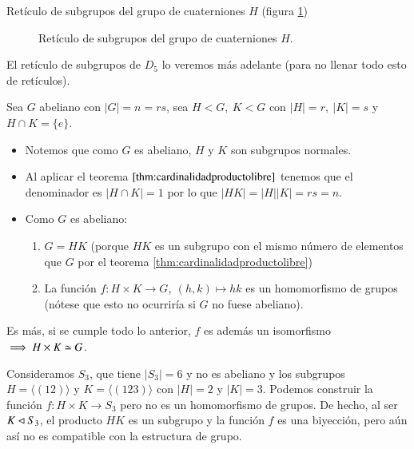 \begin{ej}
	Retículo de subgrupos del grupo de cuaterniones $H$ (figura \ref{fig:reticulocuaterniones})
	
	\begin{figure}[h]
		\centering
		\caption{Retículo de subgrupos del grupo de cuaterniones $H$.}
		\label{fig:reticulocuaterniones}
	\end{figure}
\end{ej}

El retículo de subgrupos de $D_5$ lo veremos más adelante (para no llenar todo esto de retículos).

\begin{ej}
	
	Sea $G$ abeliano con $|G| = n = rs$, sea $H < G,\ K < G$ con $|H| = r,\ |K| = s$ y $H\cap K = \{e\}$.
	\begin{itemize}
		\item Notemos que como $G$ es abeliano, $H$ y $K$ son subgrupos normales.
		\item Al aplicar el teorema $\ref{thm:cardinalidadproductolibre}$ tenemos que el denominador es $|H\cap K| = 1$ por lo que $|HK| = |H| |K| = rs= n$.
		\item Como $G$ es abeliano:
		\begin{enumerate}
			\item $G = HK$ (porque $HK$ es un subgrupo con el mismo número de elementos que $G$ por el teorema \ref{thm:cardinalidadproductolibre})
			\item La función $f:H\times K \to G,\ (h, k)\mapsto hk$ es un homomorfismo de grupos (nótese que esto no ocurriría si $G$ no fuese abeliano).
		\end{enumerate}
	\end{itemize}
	
	Es más, si se cumple todo lo anterior, $f$ es además un isomorfismo $\implies H\times K \simeq G$.
\end{ej}

\begin{ej}
	\label{ej:nohomoentreproducto}
	Consideramos $S_3$, que tiene $|S_3| = 6$ y no es abeliano y los subgrupos $H = \langle (12) \rangle$ y $K = \langle (123) \rangle$ con $|H| = 2$ y $|K| = 3$. Podemos construir la función $f:H\times K \to S_3$ pero no es un homomorfismo de grupos. De hecho, al ser $K \lhd S_3$, el producto $HK$ es un subgrupo y la función $f$ es una biyección, pero aún así no es compatible con la estructura de grupo.
\end{ej}

